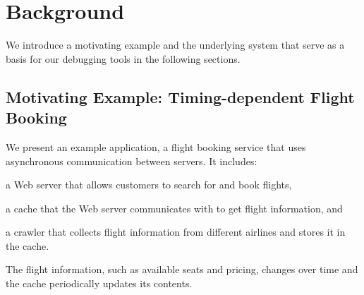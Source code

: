 \documentclass[preprint,3p]{elsarticle}
\begin{document}







\section{Background}
\label{sec:background}

We introduce a motivating example and the underlying system that serve as a basis for our debugging tools in the following sections.

\subsection{Motivating Example: Timing-dependent Flight Booking}

We present an example application, a flight booking service that uses asynchronous communication between servers. 
It includes:
\begin{inparaenum}
\item a Web server that allows customers to search for and book  flights,
\item a cache that the Web server communicates with to get flight information, and
\item a crawler that collects flight information from different  airlines and stores it in the cache.
\end{inparaenum}
The flight information, such as available seats and pricing, changes over time and the cache periodically updates its contents.
\end{document}
